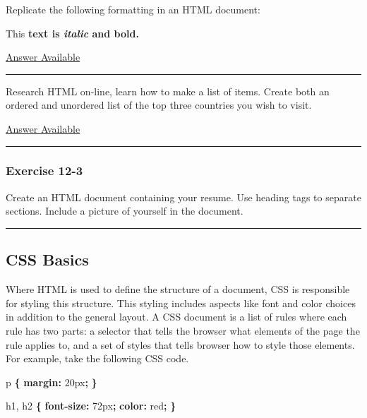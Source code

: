 \documentclass[]{memoir}
\newenvironment{Shaded}{}{}
\newcommand{\KeywordTok}[1]{\textcolor[rgb]{0.00,0.44,0.13}{\textbf{{#1}}}}
\newcommand{\DataTypeTok}[1]{\textcolor[rgb]{0.56,0.13,0.00}{{#1}}}
\newcommand{\NormalTok}[1]{{#1}}
\begin{document}
Replicate the following formatting in an HTML document:

This \textbf{text is \emph{italic} and bold.}

\hyperref[Ans-12-1]{Answer Available}

\begin{center}\rule{3in}{0.4pt}\end{center}


Research HTML on-line, learn how to make a list of items. Create both an
ordered and unordered list of the top three countries you wish to visit.

\hyperref[Ans-12-2]{Answer Available}

\begin{center}\rule{3in}{0.4pt}\end{center}

\subsubsection{Exercise 12-3}

Create an HTML document containing your resume. Use heading tags to
separate sections. Include a picture of yourself in the document.

\begin{center}\rule{3in}{0.4pt}\end{center}

\subsection{CSS Basics}

Where HTML is used to define the structure of a document, CSS is
responsible for styling this structure. This styling includes aspects
like font and color choices in addition to the general layout. A CSS
document is a list of rules where each rule has two parts: a selector
that tells the browser what elements of the page the rule applies to,
and a set of styles that tells browser how to style those elements. For
example, take the following CSS code.

\begin{Shaded}
\begin{Highlighting}[]
\NormalTok{p }\KeywordTok{\{}
    \KeywordTok{margin:} \DataTypeTok{20px}\KeywordTok{;}
\KeywordTok{\}}

\NormalTok{h1, h2 }\KeywordTok{\{}
    \KeywordTok{font-size:} \DataTypeTok{72px}\KeywordTok{;}
    \KeywordTok{color:} \DataTypeTok{red}\KeywordTok{;}
\KeywordTok{\}}
\end{Highlighting}
\end{Shaded}
\end{document}
